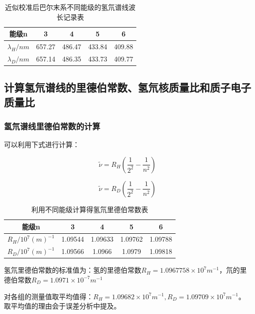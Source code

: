 \documentclass[a4paper,UTF8]{ctexart}
\begin{document}
\begin{table}[H]
    \centering
    \begin{tabular}{|c|c|c|c|c|}
    \hline
        能级n & 3 & 4 & 5 & 6 \\ \hline
        $\lambda_{H}/nm$ & 657.27 & 486.47 & 433.84 & 409.88 \\ \hline
        $\lambda_{D}/nm$ & 657.14 & 486.35 & 433.73 & 409.77 \\ \hline
    \end{tabular}
    \caption{近似校准后巴尔末系不同能级的氢氘谱线波长记录表}
\end{table}

\subsection{计算氢氘谱线的里德伯常数、氢氘核质量比和质子电子质量比}

\subsubsection{氢氘谱线里德伯常数的计算}

可以利用下式进行计算：

\begin{equation}
    \tilde{\nu} = R_{H}(\frac{1}{2^2}-\frac{1}{n^2})
\end{equation}

\begin{equation}
    \tilde{\nu} = R_{D}(\frac{1}{2^2}-\frac{1}{n^2})
\end{equation}

\begin{table}[H]
    \centering
    \begin{tabular}{|c|c|c|c|c|}
    \hline
        能级n & 3 & 4 & 5 & 6 \\ \hline
        $R_{H}/10^7(m)^{-1}$ & 1.09544 & 1.09633 & 1.09762 & 1.09788 \\ \hline
        $R_{D}/10^7(m)^{-1}$ & 1.09566 & 1.0966 & 1.0979 & 1.09818 \\ \hline
    \end{tabular}
    \caption{利用不同能级计算得氢氘里德伯常数表}
\end{table}

氢氘里德伯常数的标准值为：氢的里德伯常数$R_{H} = 1.0967758 \times 10^7m^{-1}$，氘的里德伯常数$R_{D} = 1.0971 \times 10^{-7} m^{-1}$

对各组的测量值取平均值得：$R_{H}= 1.09682 \times 10^7 m^{-1},R_{D} = 1.09709 \times 10^7 m^{-1}$。取平均值的理由会于误差分析中提及。
\end{document}
